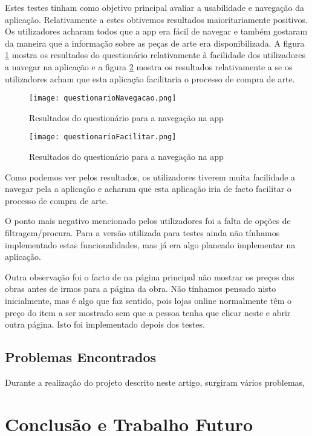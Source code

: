 \documentclass[conference]{IEEEtran}
\begin{document}
Estes testes tinham como objetivo principal avaliar a usabilidade e navegação da aplicação. Relativamente a estes obtivemos resultados maioritariamente positivos. Os utilizadores acharam todos que a app era fácil de navegar e também gostaram da maneira que a informação sobre as peças de arte era disponibilizada. A figura
\ref{fig:navegacaoTest}
mostra os resultados do questionário relativamente à facilidade dos utilizadores a navegar na aplicação e a figura
\ref{fig:facilitaTest}
mostra os resultados relativamente a se os utilizadores acham que esta aplicação facilitaria o processo de compra de arte.

\begin{figure}[ht]
    \centering
    \texttt{[image: questionarioNavegacao.png]}
    \caption{Resultados do questionário para a navegação na app}
    \label{fig:navegacaoTest}
\end{figure}

\begin{figure}[ht]
    \centering
    \texttt{[image: questionarioFacilitar.png]}
    \caption{Resultados do questionário para a navegação na app}
    \label{fig:facilitaTest}
\end{figure}

Como podemos ver pelos resultados, os utilizadores tiverem muita facilidade a navegar pela a aplicação e acharam que esta aplicação iria de facto facilitar o processo de compra de arte.

O ponto mais negativo mencionado pelos utilizadores foi a falta de opções de filtragem/procura. Para a versão utilizada para testes ainda não tínhamos implementado estas funcionalidades, mas já era algo planeado implementar na aplicação.

Outra observação foi o facto de na página principal não mostrar os preços das obras antes de irmos para a página da obra. Não tínhamos pensado nisto inicialmente, mas é algo que faz sentido, pois lojas online normalmente têm o preço do item a ser mostrado sem que a pessoa tenha que clicar neste e abrir outra página. Isto foi implementado depois dos testes.

\subsection{Problemas Encontrados}

Durante a realização do projeto descrito neste artigo, surgiram vários problemas, 

\section{Conclusão e Trabalho Futuro}



\end{document}
